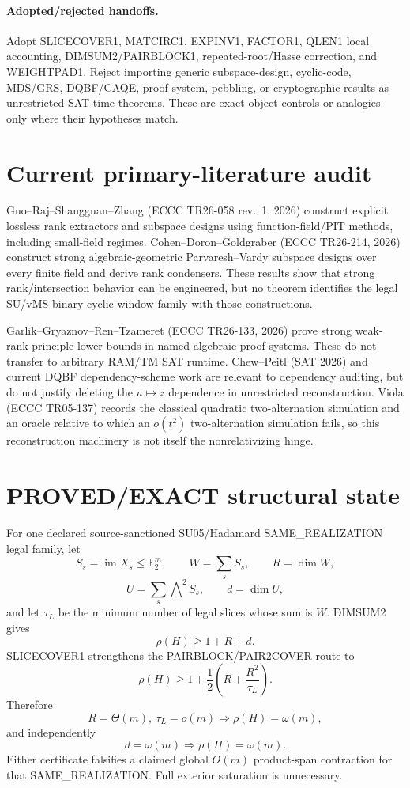 \documentclass[11pt]{article}
\begin{document}
\paragraph{Adopted/rejected handoffs.}
Adopt SLICECOVER1, MATCIRC1, EXPINV1, FACTOR1, QLEN1 local accounting, DIMSUM2/PAIRBLOCK1, repeated-root/Hasse correction, and WEIGHTPAD1. Reject importing generic subspace-design, cyclic-code, MDS/GRS, DQBF/CAQE, proof-system, pebbling, or cryptographic results as unrestricted SAT-time theorems. These are exact-object controls or analogies only where their hypotheses match.

\section*{Current primary-literature audit}
Guo--Raj--Shangguan--Zhang (ECCC TR26-058 rev.~1, 2026) construct explicit lossless rank extractors and subspace designs using function-field/PIT methods, including small-field regimes. Cohen--Doron--Goldgraber (ECCC TR26-214, 2026) construct strong algebraic-geometric Parvaresh--Vardy subspace designs over every finite field and derive rank condensers. These results show that strong rank/intersection behavior can be engineered, but no theorem identifies the legal SU/vMS binary cyclic-window family with those constructions.

Garlik--Gryaznov--Ren--Tzameret (ECCC TR26-133, 2026) prove strong weak-rank-principle lower bounds in named algebraic proof systems. These do not transfer to arbitrary RAM/TM SAT runtime. Chew--Peitl (SAT 2026) and current DQBF dependency-scheme work are relevant to dependency auditing, but do not justify deleting the \(u\mapsto z\) dependence in unrestricted reconstruction. Viola (ECCC TR05-137) records the classical quadratic two-alternation simulation and an oracle relative to which an \(o(t^2)\) two-alternation simulation fails, so this reconstruction machinery is not itself the nonrelativizing hinge.

\section*{PROVED/EXACT structural state}
For one declared source-sanctioned SU05/Hadamard SAME\_REALIZATION legal family, let
\[
S_s=\operatorname{im}X_s\le\mathbb F_2^m,\qquad
W=\sum_s S_s,\qquad R=\dim W,
\]
\[
U=\sum_s\bigwedge\nolimits^2S_s,\qquad d=\dim U,
\]
and let \(\tau_L\) be the minimum number of legal slices whose sum is \(W\). DIMSUM2 gives
\[
\boxed{\rho(H)\ge1+R+d.}
\]
SLICECOVER1 strengthens the PAIRBLOCK/PAIR2COVER route to
\[
\boxed{\rho(H)\ge1+\frac12\left(R+\frac{R^2}{\tau_L}\right).}
\]
Therefore
\[
\boxed{R=\Theta(m),\ \tau_L=o(m)\Longrightarrow \rho(H)=\omega(m),}
\]
and independently
\[
\boxed{d=\omega(m)\Longrightarrow \rho(H)=\omega(m).}
\]
Either certificate falsifies a claimed global \(O(m)\) product-span contraction for that SAME\_REALIZATION. Full exterior saturation is unnecessary.
\end{document}
